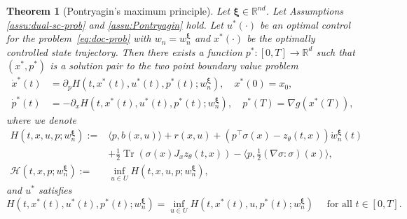 \documentclass[11pt]{article}
\numberwithin{equation}{section}
\theoremstyle{plain}
\newtheorem{theorem}{Theorem}[section]
\theoremstyle{definition}
\theoremstyle{remark}
\newcommand{\op}{\operatorname}
\newcommand{\R}{\mathbb{R}}
\begin{document}
\begin{theorem}[Pontryagin's maximum principle]
\label{thm:pontryagin}
Let $\bm{\xi}\in \R^{nd}$. Let Assumptions \ref{assu:dual-sc-prob} and \ref{assu:Pontryagin} hold. Let $u^*(\cdot)$ be an optimal control for the problem~\eqref{eq:doc-prob} with $w_n = w_n^{\bm{\xi}}$ and $x^*(\cdot)$ be the optimally controlled state trajectory. Then there exists a function $p^*:[0,T] \to \R^d$ such that $(x^*, p^*)$ is a solution pair to the two point boundary value problem 
\begin{equation} \label{eq:two-point-boundary-value-prob}
    \begin{aligned}
        \dot{x}^*(t) &= \partial_p H(t, x^*(t), u^*(t), p^*(t); w_n^{\bm{\xi}}), \quad x^*(0) = x_0, \\
        \dot{p}^*(t) &= -\partial_x H(t,x^*(t), u^*(t), p^*(t); w_n^{\bm{\xi}}), \quad p^*(T) = \nabla g(x^*(T)), 
    \end{aligned}
\end{equation}
where we denote 
\begin{equation} \label{eq:hamiltonian-defi}
\begin{aligned}
    H(t,x,u,p; w_n^{\bm{\xi}}) := &\langle p, b(x,u)\rangle + r(x, u) + \left( p^\top \sigma(x) - z_\theta(t,x) \right) \dot{w}_n^{\bm{\xi}}(t)  \\
    &+ \frac{1}{2}\op{Tr}(\sigma(x) J_xz_\theta(t,x)) - \langle p, \frac{1}{2}(\nabla \sigma:\sigma)(x)\rangle, \\
    \mathcal{H}(t,x,p;w_n^{\bm{\xi}}) :=&\inf_{u\in U} H(t,x,u,p; w_n^{\bm{\xi}}), 
\end{aligned}
\end{equation}
and $u^*$ satisfies 
\begin{equation} \label{eq:u-star}
    H(t, x^*(t), u^*(t), p^*(t); w_n^{\bm{\xi}}) = \inf_{u\in U} H(t, x^*(t), u, p^*(t); w_n^{\bm{\xi}}) \quad \text{ for all } t \in [0,T].
\end{equation}
\end{theorem}
\end{document}
